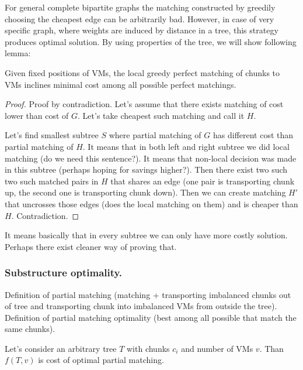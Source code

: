 For general complete bipartite graphs the matching constructed by greedily choosing the cheapest edge can be arbitrarily bad.
However, in case of very specific graph, where weights are induced by distance in a tree, this strategy produces optimal solution.
By using properties of the tree, we will show following lemma:

\begin{lemma}
  Given fixed positions of VMs, the local greedy perfect matching of chunks to VMs inclines minimal cost among all possible perfect matchings.
\end{lemma}

\begin{proof}
Proof by contradiction. Let's assume that there exists matching of cost lower than cost of $G$. Let's take cheapest such matching and call it $H$.

Let's find smallest subtree $S$ where partial matching of $G$ has different cost than partial matching of $H$. It means that in both left and right subtree we did local matching (do we need this sentence?). It means that non-local decision was made in this subtree (perhaps hoping for savings higher?). Then there exist two such two such matched pairs in $H$ that shares an edge (one pair is transporting chunk up, the second one is transporting chunk down). Then we can create matching $H'$ that uncrosses those edges (does the local matching on them) and is cheaper than $H$. Contradiction.


\end{proof}

It means basically that in every subtree we can only have more costly solution. Perhaps there exist cleaner way of proving that.

\subsubsection{Substructure optimality.}

Definition of partial matching (matching + transporting imbalanced chunks out of tree and transporting chunk into imbalanced VMs from outside the tree). Definition of partial matching optimality (best among all possible that match the same chunks).

\begin{lemma}

Let's consider an arbitrary tree $T$ with chunks $c_i$ and number of VMs $v$. Than $f(T, v)$ is cost of optimal partial matching.

\end{lemma}

